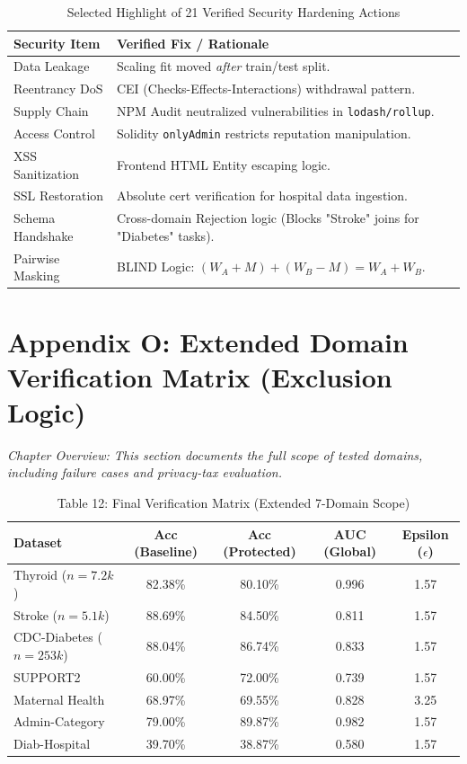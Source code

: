\documentclass[10pt, a4paper, twocolumn]{article}
\begin{document}
\begin{table}[hbt!]
    \centering
    \begin{tabular}{@{}lp{10cm}@{}}
        \toprule
        \textbf{Security Item} & \textbf{Verified Fix / Rationale} \\ \midrule
        Data Leakage & Scaling fit moved \textit{after} train/test split. \\
        Reentrancy DoS & CEI (Checks-Effects-Interactions) withdrawal pattern. \\
        Supply Chain & NPM Audit neutralized vulnerabilities in \texttt{lodash/rollup}. \\
        Access Control & Solidity \texttt{onlyAdmin} restricts reputation manipulation. \\
        XSS Sanitization & Frontend HTML Entity escaping logic. \\
        SSL Restoration & Absolute cert verification for hospital data ingestion. \\
        Schema Handshake & Cross-domain Rejection logic (Blocks "Stroke" joins for "Diabetes" tasks). \\
        Pairwise Masking & BLIND Logic: $(W_A + M) + (W_B - M) = W_A + W_B$. \\ \bottomrule
    \end{tabular}
    \caption*{Selected Highlight of 21 Verified Security Hardening Actions}
\end{table}

\section*{Appendix O: Extended Domain Verification Matrix (Exclusion Logic)}
\textit{Chapter Overview: This section documents the full scope of tested domains, including failure cases and privacy-tax evaluation.}

\begin{table}[hbt!]
\centering
\begin{tabular}{lcccc}
\toprule
\textbf{Dataset} & \textbf{Acc (Baseline)} & \textbf{Acc (Protected)} & \textbf{AUC (Global)} & \textbf{Epsilon ($\epsilon$)} \\ \midrule
Thyroid ($n=7.2k$) & 82.38\% & 80.10\% & 0.996 & 1.57 \\
Stroke ($n=5.1k$) & 88.69\% & 84.50\% & 0.811 & 1.57 \\
CDC-Diabetes ($n=253k$) & 88.04\% & 86.74\% & 0.833 & 1.57 \\
SUPPORT2 & 60.00\% & 72.00\% & 0.739 & 1.57 \\
Maternal Health & 68.97\% & 69.55\% & 0.828 & 3.25 \\
Admin-Category & 79.00\% & 89.87\% & 0.982 & 1.57 \\
Diab-Hospital & 39.70\% & 38.87\% & 0.580 & 1.57 \\ \bottomrule
\end{tabular}
\caption{Table 12: Final Verification Matrix (Extended 7-Domain Scope)}
\end{table}
\end{document}

